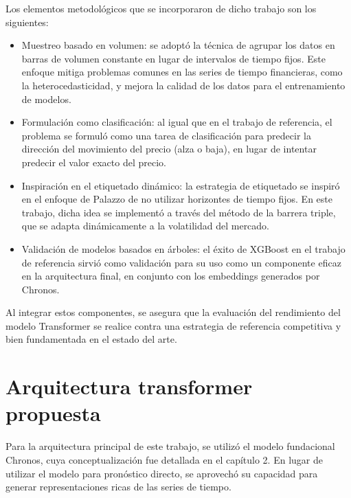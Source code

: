 Los elementos metodológicos que se incorporaron de dicho trabajo son los siguientes:
\begin{itemize}
    \item Muestreo basado en volumen: se adoptó la técnica de agrupar los datos en barras de volumen constante en lugar de intervalos de tiempo fijos. Este enfoque mitiga problemas comunes en las series de tiempo financieras, como la heterocedasticidad, y mejora la calidad de los datos para el entrenamiento de modelos.
    \item Formulación como clasificación: al igual que en el trabajo de referencia, el problema se formuló como una tarea de clasificación para predecir la dirección del movimiento del precio (alza o baja), en lugar de intentar predecir el valor exacto del precio.
    \item Inspiración en el etiquetado dinámico: la estrategia de etiquetado se inspiró en el enfoque de Palazzo de no utilizar horizontes de tiempo fijos. En este trabajo, dicha idea se implementó a través del método de la barrera triple, que se adapta dinámicamente a la volatilidad del mercado.
    \item Validación de modelos basados en árboles: el éxito de XGBoost en el trabajo de referencia sirvió como validación para su uso como un componente eficaz en la arquitectura final, en conjunto con los embeddings generados por Chronos.
\end{itemize}

Al integrar estos componentes, se asegura que la evaluación del rendimiento del modelo Transformer se realice contra una estrategia de referencia competitiva y bien fundamentada en el estado del arte.

\section{Arquitectura transformer propuesta}

Para la arquitectura principal de este trabajo, se utilizó el modelo fundacional Chronos, cuya conceptualización fue detallada en el capítulo 2. En lugar de utilizar el modelo para pronóstico directo, se aprovechó su capacidad para generar representaciones ricas de las series de tiempo.

